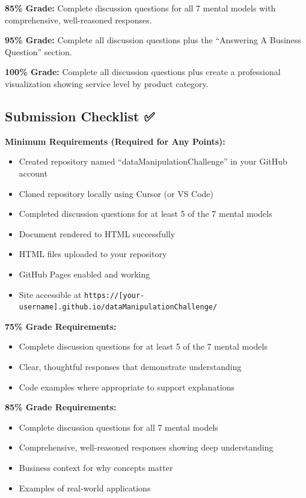\documentclass[
]{article}
\providecommand{\tightlist}{%
  \setlength{\itemsep}{0pt}\setlength{\parskip}{0pt}}
\begin{document}
\textbf{85\% Grade:} Complete discussion questions for all 7 mental
models with comprehensive, well-reasoned responses.

\textbf{95\% Grade:} Complete all discussion questions plus the
``Answering A Business Question'' section.

\textbf{100\% Grade:} Complete all discussion questions plus create a
professional visualization showing service level by product category.

\subsection{Submission Checklist ✅}\label{submission-checklist}

\textbf{Minimum Requirements (Required for Any Points):}

\begin{itemize}
\tightlist
\item[$\square$]
  Created repository named ``dataManipulationChallenge'' in your GitHub
  account
\item[$\square$]
  Cloned repository locally using Cursor (or VS Code)
\item[$\square$]
  Completed discussion questions for at least 5 of the 7 mental models
\item[$\square$]
  Document rendered to HTML successfully
\item[$\square$]
  HTML files uploaded to your repository
\item[$\square$]
  GitHub Pages enabled and working
\item[$\square$]
  Site accessible at
  \texttt{https://{[}your-username{]}.github.io/dataManipulationChallenge/}
\end{itemize}

\textbf{75\% Grade Requirements:}

\begin{itemize}
\tightlist
\item[$\square$]
  Complete discussion questions for at least 5 of the 7 mental models
\item[$\square$]
  Clear, thoughtful responses that demonstrate understanding
\item[$\square$]
  Code examples where appropriate to support explanations
\end{itemize}

\textbf{85\% Grade Requirements:}

\begin{itemize}
\tightlist
\item[$\square$]
  Complete discussion questions for all 7 mental models
\item[$\square$]
  Comprehensive, well-reasoned responses showing deep understanding
\item[$\square$]
  Business context for why concepts matter
\item[$\square$]
  Examples of real-world applications
\end{itemize}
\end{document}
